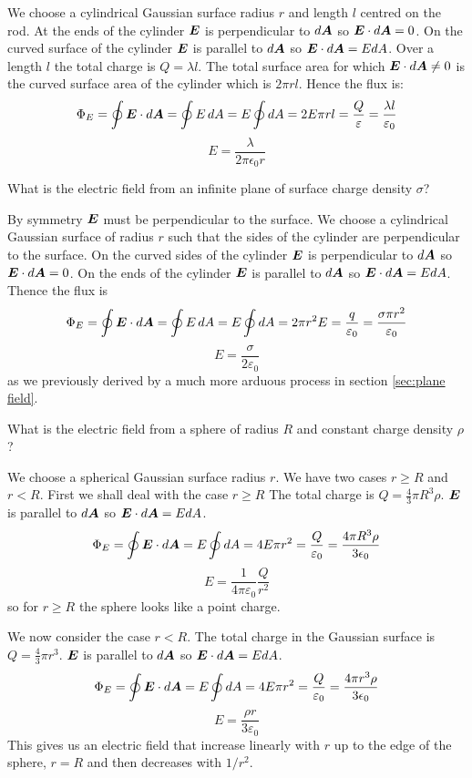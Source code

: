 \documentclass{article}
\begin{document}
    We choose a cylindrical Gaussian surface radius \(r\) and length \(l\) centred on the rod.
    At the ends of the cylinder \(\bm{E}\) is perpendicular to \(d\bm{A}\) so \(\bm{E}\cdot d\bm{A} = 0\).
    On the curved surface of the cylinder \(\bm{E}\) is parallel to \(d\bm{A}\) so \(\bm{E}\cdot d\bm{A} = EdA\).
    Over a length \(l\) the total charge is \(Q = \lambda l\).
    The total surface area for which \(\bm{E}\cdot d\bm{A}\ne 0\) is the curved surface area of the cylinder which is \(2\pi rl\).
    Hence the flux is:
    \[\Phi_E = \oint\bm{E}\cdot d\bm{A} = \oint E\,dA = E\oint dA = 2E\pi rl = \frac{Q}{\varepsilon} = \frac{\lambda l}{\varepsilon_0}\]
    \[E = \frac{\lambda}{2\pi\epsilon_0r}\]
    
    \example
    What is the electric field from an infinite plane of surface charge density \(\sigma\)?
    
    By symmetry \(\bm{E}\) must be perpendicular to the surface.
    We choose a cylindrical Gaussian surface of radius \(r\) such that the sides of the cylinder are perpendicular to the surface.
    On the curved sides of the cylinder \(\bm{E}\) is perpendicular to \(d\bm{A}\) so \(\bm{E}\cdot d\bm{A} = 0\).
    On the ends of the cylinder \(\bm{E}\) is parallel to \(d\bm{A}\) so \(\bm{E} \cdot d\bm{A} = EdA\).
    Thence the flux is
    \[\Phi_E = \oint \bm{E}\cdot d\bm{A} = \oint E\,dA = E\oint dA = 2\pi r^2 E = \frac{q}{\varepsilon_0} = \frac{\sigma\pi r^2}{\varepsilon_0}\]
    \[E = \frac{\sigma}{2\varepsilon_0}\]
    as we previously derived by a much more arduous process in section \ref{sec:plane field}.
    
    \example
    What is the electric field from a sphere of radius \(R\) and constant charge density \(\rho\)?
    
    We choose a spherical Gaussian surface radius \(r\).
    We have two cases \(r \ge R\) and \(r < R\).
    First we shall deal with the case \(r \ge R\)
    The total charge is \(Q = \frac{4}{3}\pi R^3\rho\).
    \(\bm{E}\) is parallel to \(d\bm{A}\) so \(\bm{E}\cdot d\bm{A} = EdA\).
    \[\Phi_E = \oint \bm{E}\cdot d\bm{A} = E\oint dA = 4E\pi r^2 = \frac{Q}{\varepsilon_0} = \frac{4\pi R^3\rho}{3\epsilon_0}\]
    \[E = \frac{1}{4\pi\varepsilon_0}\frac{Q}{r^2}\]
    so for \(r \ge R\) the sphere looks like a point charge.
    
    We now consider the case \(r < R\).
    The total charge in the Gaussian surface is \(Q = \frac{4}{3}\pi r^3\).
    \(\bm{E}\) is parallel to \(d\bm{A}\) so \(\bm{E}\cdot d\bm{A} = EdA\).
    \[\Phi_E = \oint \bm{E}\cdot d\bm{A} = E\oint dA = 4E\pi r^2 = \frac{Q}{\varepsilon_0} = \frac{4\pi r^3\rho}{3\epsilon_0}\]
    \[E = \frac{\rho r}{3\varepsilon_0}\]
    This gives us an electric field that increase linearly with \(r\) up to the edge of the sphere, \(r = R\) and then decreases with \(1/r^2\).
    
\end{document}
